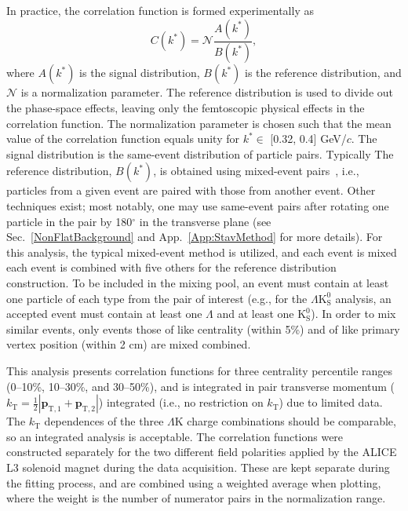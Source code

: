 \documentclass[ALICE,manyauthors]{cernphprep}
\newcommand{\kstar}{$k^{*}$\xspace}
\newcommand{\Lam}{$\Lambda$\xspace}
\newcommand{\Ks}{$\mathrm{K^{0}_{S}}$\xspace}
\newcommand{\LamK}{$\Lambda$K\xspace}
\newcommand{\LamKs}{$\Lambda\mathrm{K^{0}_{S}}$\xspace}
\begin{document}
In practice, the correlation function is formed experimentally as
\begin{equation}
  C(k^{*}) = \mathcal{N}\frac{A(k^{*})}{B(k^{*})},
\label{eqn:CfExp}
\end{equation}
where $A(k^{*})$ is the signal distribution, $B(k^{*})$ is the reference distribution, and $\mathcal{N}$ is a normalization parameter.  
The reference distribution is used to divide out the phase-space effects, leaving only the {\color{red}femtoscopic} {\color{blue}physical} effects in the correlation function. 
The normalization parameter is chosen such that the mean value of the correlation function equals unity for \kstar $\in$ [0.32, 0.4] GeV/$c$.
The signal distribution is the same-event distribution of particle pairs.
{\color{red}Typically} {\color{blue}The reference distribution}, $B(k^{*})${\color{blue},} is obtained using mixed-event pairs~\cite{Kopylov:1974th}, i.e., particles from a given event are paired with those from another event.
{\color{red}Other techniques exist; most notably, one may use same-event pairs after rotating one particle in the pair by 180$^\circ$ in the transverse plane (see Sec.~\ref{NonFlatBackground} and App.~\ref{App:StavMethod} for more details).}
For this analysis, {\color{red}the typical mixed-event method is utilized, and each event is mixed} {\color{blue}each event is combined} with five others for the reference distribution construction.
{\color{blue}To be included in the mixing pool, an event must contain at least one particle of each type from the pair of interest (e.g., for the \LamKs analysis, an accepted event must contain at least one \Lam and at least one \Ks).}
In order to mix similar events, only {\color{red}events} {\color{blue}those} of like centrality (within 5\%) and of like primary vertex position (within 2 cm) are {\color{red}mixed} {\color{blue}combined}.

This analysis presents correlation functions for three centrality percentile ranges (0--10\%, 10--30\%, and 30--50\%), and is {\color{blue}integrated in} pair transverse momentum ($k_{\mathrm{T}} = \frac{1}{2}|\mathbf{p}_{\mathrm{T,1}}+\mathbf{p}_{\mathrm{T,2}}|$) {\color{red}integrated (i.e., no restriction on $k_{\mathrm{T}}$)} due to limited data.
The $k_{\mathrm{T}}$ dependences of the three \LamK charge combinations should be comparable, so an integrated analysis is acceptable.
{\color{red}The correlation functions were constructed separately for the two different field polarities applied by the ALICE L3 solenoid magnet during the data acquisition.
These are kept separate during the fitting process, and are combined using a weighted average when plotting, where the weight is the number of numerator pairs in the normalization range.}
\end{document}
